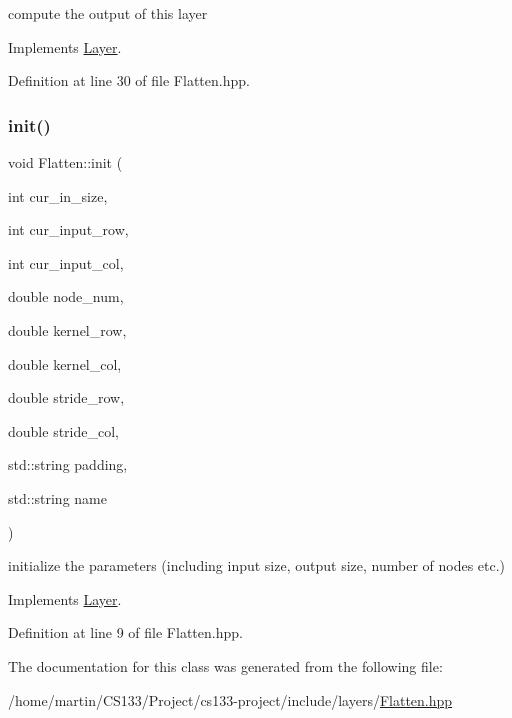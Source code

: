 compute the output of this layer 



Implements \hyperlink{class_layer_ac0b116d692ea457f8e7c0f79f7159004}{Layer}.



Definition at line 30 of file Flatten.\+hpp.

\mbox{\label{class_flatten_af389526bc8d45a447eaf2a3f8336d2a8}} 
\subsubsection{\texorpdfstring{init()}{init()}}
{\footnotesize\ttfamily void Flatten\+::init (\begin{DoxyParamCaption}\item[{int}]{cur\+\_\+in\+\_\+size,  }\item[{int}]{cur\+\_\+input\+\_\+row,  }\item[{int}]{cur\+\_\+input\+\_\+col,  }\item[{double}]{node\+\_\+num,  }\item[{double}]{kernel\+\_\+row,  }\item[{double}]{kernel\+\_\+col,  }\item[{double}]{stride\+\_\+row,  }\item[{double}]{stride\+\_\+col,  }\item[{std\+::string}]{padding,  }\item[{std\+::string}]{name }\end{DoxyParamCaption})\hspace{0.3cm}{\ttfamily [virtual]}}



initialize the parameters (including input size, output size, number of nodes etc.) 



Implements \hyperlink{class_layer_aab662b9c8e61cd7375cbb4413d2e3037}{Layer}.



Definition at line 9 of file Flatten.\+hpp.



The documentation for this class was generated from the following file\+:\begin{DoxyCompactItemize}
\item 
/home/martin/\+C\+S133/\+Project/cs133-\/project/include/layers/\hyperlink{flatten_8hpp}{Flatten.\+hpp}\end{DoxyCompactItemize}
